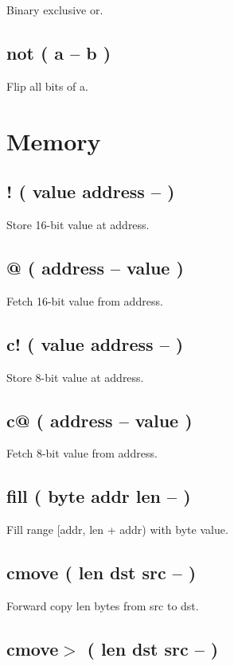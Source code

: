 Binary exclusive or.

\subsection{not ( a -- b )}

Flip all bits of a.


\section{Memory}

\subsection{! ( value address -- )}

Store 16-bit value at address.

\subsection{@ ( address -- value )}

Fetch 16-bit value from address.

\subsection{c! ( value address -- )}

Store 8-bit value at address.

\subsection{c@ ( address -- value )}

Fetch 8-bit value from address.

\subsection{fill ( byte addr len -- )}

Fill range [addr, len + addr) with byte value.

\subsection{cmove ( len dst src -- )}

Forward copy len bytes from src to dst.

\subsection{cmove$>$ ( len dst src -- )}

